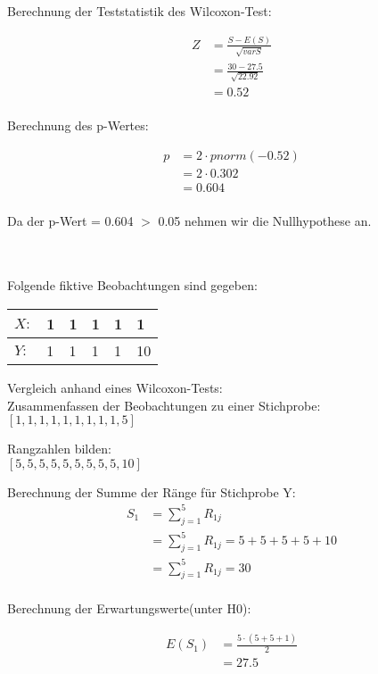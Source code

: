 \documentclass[a4paper,12pt]{article}
\begin{document}
Berechnung der Teststatistik des Wilcoxon-Test:

\begin{align*}
Z
&= \frac{S-E(S)}{\sqrt{varS}} \\
&= \frac{30-27.5}{\sqrt{22.92}}  \\
&=  0.52 \\
\end{align*}

Berechnung des p-Wertes:

\begin{align*}
p
&= 2 \cdot pnorm(-0.52) \\
&= 2 \cdot 0.302  \\
&= 0.604 \\
\end{align*}

Da der p-Wert = 0.604 $>$ 0.05 nehmen wir die Nullhypothese an.

\\\\
Folgende fiktive Beobachtungen sind gegeben:\\

\begin{tabular}{ | l | l | l | l | l | p{0.5cm} |}
	\hline
	$X:$ & 1 & 1 & 1 & 1 & 1 \\ \hline
	$Y:$ & 1 & 1 & 1 & 1 & 10 \\ \hline
\end{tabular}

Vergleich anhand eines Wilcoxon-Tests:\\

Zusammenfassen der Beobachtungen zu einer Stichprobe: \\

$[1,1,1,1,1,1,1,1,1,5]$

Rangzahlen bilden: \\

$[5,5,5,5,5,5,5,5,5,10]$


Berechnung der Summe der Ränge für Stichprobe Y:
\begin{align*}
S_1 
&= \sum_{j=1}^{5} R_{1j} \\
&= \sum_{j=1}^{5} R_{1j} = 5+5+5+5+10 \\
&= \sum_{j=1}^{5} R_{1j} = 30	\\
\end{align*}

Berechnung der Erwartungswerte(unter H0):

\begin{align*}
E(S_1)
&= \frac{5\cdot(5+5+1)}{2} \\
&= 27.5 \\
\end{align*}
\end{document}
